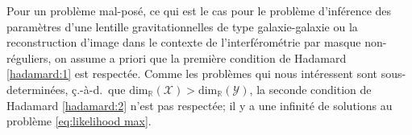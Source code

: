 Pour un problème mal-posé, ce qui est le cas pour le problème d'inférence des paramètres d'une lentille 
gravitationnelles de type galaxie-galaxie ou la reconstruction d'image dans le contexte de l'interférométrie  
par masque non-réguliers, on assume a priori que la première condition de Hadamard \ref{hadamard:1} est respectée. 
Comme les problèmes qui nous intéressent sont sous-determinées, 
ç.-à-d.\ que $\mathrm{dim}_{\mathbb{R}}(\mathcal{X}) > \mathrm{dim}_{\mathbb{R}}(\mathcal{Y})$,
la seconde condition de Hadamard \ref{hadamard:2} n'est pas respectée; il y a une infinité de solutions au problème \eqref{eq:likelihood max}.



